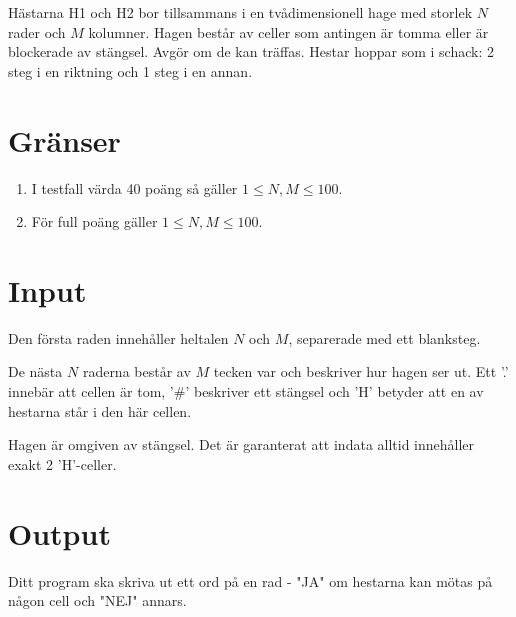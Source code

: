 Hästarna H1 och H2 bor tillsammans i en tvådimensionell hage med storlek $N$ rader och $M$ kolumner. Hagen består av celler som antingen är tomma eller är blockerade av stängsel. Avgör om de kan träffas. Hestar hoppar som i schack: 2 steg i en riktning och 1 steg i en annan.

\section*{Gränser}
\begin{enumerate}
\item I testfall värda 40 poäng så gäller $1 \le N,M \le 100$.
\item För full poäng gäller $1 \le N,M \le 100$.
\end{enumerate}

\section*{Input}
Den första raden innehåller heltalen $N$ och $M$, separerade med ett blanksteg.

De nästa $N$ raderna består av $M$ tecken var och beskriver hur hagen ser ut. Ett '.' innebär att cellen är tom, '\#' beskriver ett stängsel och 'H' betyder att en av hestarna står i den här cellen.

Hagen är omgiven av stängsel. Det är garanterat att indata alltid innehåller exakt 2 'H'-celler.

\section*{Output}
Ditt program ska skriva ut ett ord på en rad - "JA" om hestarna kan mötas på någon cell och "NEJ" annars.

